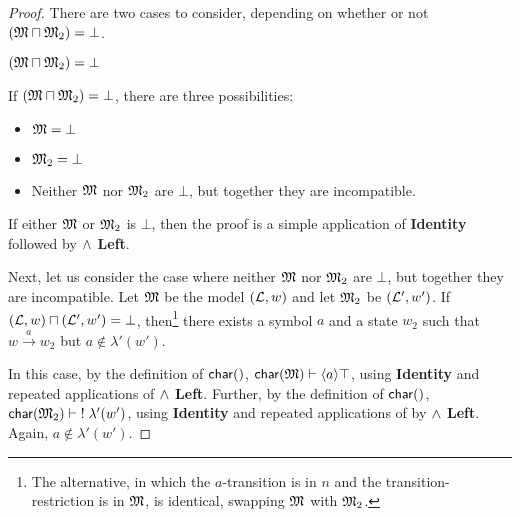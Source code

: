 \begin{proof}

There are two cases to consider, depending on whether or not $(\frak{M} \sqcap \frak{M}_2) = \bot$.

\setcounter{mycase}{0}

\begin{mycase}
$(\frak{M} \sqcap \frak{M}_2) = \bot$
\end{mycase}
If $(\frak{M} \sqcap \frak{M}_2) = \bot$, there are three possibilities:
\begin{itemize}
\item
$\frak{M} = \bot$
\item
$\frak{M}_2 = \bot$
\item
Neither $\frak{M}$ nor $\frak{M}_2$ are $\bot$, but together they are incompatible. 
\end{itemize}
If either $\frak{M}$ or $\frak{M}_2$ is $\bot$, then the proof is a simple application of {\bf Identity} followed by {\bf $\land$ Left}.

Next, let us consider the case where neither $\frak{M}$ nor $\frak{M}_2$ are $\bot$, but together they are incompatible.
Let $\frak{M}$ be the  model $(\mathcal{L}, w)$ and let $\frak{M}_2$ be $(\mathcal{L}', w')$.
If $(\mathcal{L}, w) \sqcap (\mathcal{L}', w') = \bot$, then\footnote{The alternative, in which the $a$-transition is in $n$ and the transition-restriction is in $\frak{M}$, is identical, swapping $\frak{M}$ with $\frak{M}_2$.} there exists a symbol $a$ and a state $w_2$ such that $w \xrightarrow{a} w_2$ but $a \notin \lambda'(w')$.

In this case, by the definition of $ \CHAR$, $  \mathsf{char}(\frak{M}) \vdash \langle a \rangle \top$, using  {\bf Identity} and repeated applications of {\bf $\land$ Left}.
Further, by the definition of $ \CHAR$, $ \mathsf{char}(\frak{M}_2) \vdash \; ! \; \lambda'(w')$, using  {\bf Identity} and repeated applications of by {\bf $\land$ Left}. Again, $a \notin  \lambda'(w')$.


\end{proof}
